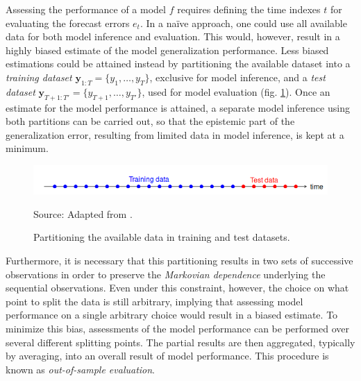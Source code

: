 Assessing the performance of a model $f$ requires defining the time indexes $t$ for evaluating the forecast errors $e_{t}$.
In a naïve approach, one could use all available data for both model inference and evaluation. This would, however, result in a highly biased estimate of the model generalization performance. Less biased estimations could be attained instead by partitioning the available dataset into a \textit{training dataset} $\boldsymbol{y} _{1:T} = \{y_1,…,y_T\}$, exclusive for model inference, and a \textit{test dataset} $\boldsymbol{y} _{T+1:T'} = \{y_{T+1},…,y_{T'}\}$, used for model evaluation (fig. \ref{fig:training_test_split}). Once an estimate for the model performance is attained, a separate model inference using both partitions can be carried out, so that the epistemic part of the generalization error, resulting from limited data in model inference, is kept at a minimum.
\begin{figure}[H]%
   \centering
    \caption{Partitioning the available data in training and test datasets.}
    \includegraphics[scale=0.8]{traintest_split.png} \\
    \raggedright
    Source: Adapted from \cite{krispin2019handson}.
   \label{fig:training_test_split}
\end{figure}

Furthermore, it is necessary that this partitioning results in two sets of successive observations in order to preserve the \textit{Markovian dependence} underlying the sequential observations. Even under this constraint, however, the choice on what point to split the data is still arbitrary, implying that assessing model performance on a single arbitrary choice would result in a biased estimate. To minimize this bias, assessments of the model performance can be performed over several different splitting points. The partial results are then aggregated, typically by averaging, into an overall result of model performance. This procedure is known as \textit{out-of-sample evaluation}.

